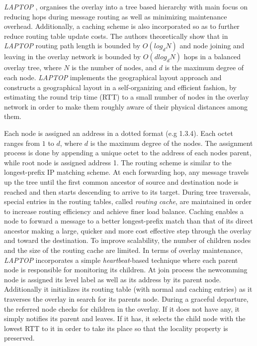 \documentclass[acmcsur]{acmtrans2m}
\begin{document}
\textit{LAPTOP} \cite{wu_laptop_2007},  organises the overlay into a tree based
hierarchy with main focus on reducing hops during message routing as well as
minimizing maintenance overhead. Additionally, a caching scheme is also
incorporated so as to further reduce routing table update costs. The authors
theoretically show that in \textit{LAPTOP} routing path length is bounded by $O(log_d
N)$ and node joining and leaving in the overlay network is bounded by $O\left( d
log_d N \right)$ hops in a balanced overlay tree, where $N$ is the number of
nodes, and $d$ is the maximum degree of each node. \textit{LAPTOP} implements
the geographical layout approach  and constructs a geographical layout in a
self-organizing and efficient fashion, by estimating the round trip time (RTT)
to a small number of nodes in the overlay network in order to make them roughly
aware of their physical distances among them.

Each node is assigned an address in a dotted format (e.g 1.3.4). Each octet
ranges from $1$ to $d$, where $d$ is the maximum degree of the nodes. The
assignment process is done by appending a unique octet to the address of each
nodes
parent, while root node is assigned address 1.  The routing scheme is similar to the
longest-prefix IP matching scheme. At each forwarding hop, any message travels
up the tree until the first common ancestor of source and destination node is
reached and then starts descending to arrive to its target. During tree
traversals, special entries in the routing tables, called \emph{routing cache},
are maintained in order to increase routing efficiency and achieve finer load
balance. Caching enables a node to forward a message to a better longest-prefix
match than that of its direct ancestor making a large, quicker and more cost
effective step through the overlay and toward the destination. To improve
scalability, the number of children nodes and the size of the routing cache are
limited.  In terms of overlay maintenance, \textit{LAPTOP} incorporates a simple
\emph{heartbeat}-based technique where each parent node is responsible for
monitoring its children.  At join process the newcomming node is assigned its
level label as well as its address by its parent node. Additionally it
initializes its routing table (with normal and caching entries) as it traverses
the overlay in search for its parents node.  During a graceful departure, the
referred node checks for children in the overlay. If it does not have any, it
simply notifies its parent and leaves. If it has, it selects the child node with
the lowest RTT to it in order to take its place so that the locality property is
preserved.
\end{document}
